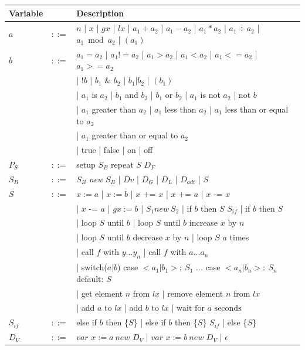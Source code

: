 \begin{table}[H]
\centering
\begin{tabular}{@{}lll@{}}
\toprule
Variable &       & Description                      \\ \midrule
$a$        & $::=$ & $n$ | $x$ | $gx$ | $lx$ | $a_1 + a_2$ | $a_1 - a_2$ | $a_1 * a_2$ | $a_1 \div a_2$ | $a_1 \bmod a_2$ | $ (a_1) $    \\
$b$        & $::=$ & $a_1 = a_2$ | $a_1 != a_2$ | $a_1 > a_2$ | $a_1 < a_2$ | $a_1 <= a_2$ | $a_1 >= a_2$            \\
            & & | $!b$ | $b_1$ \& $b_2$ | $b_1 | b_2$ | $(b_1)$  \\
            &&  | $a_1$ is $a_2$ | $b_1$ and $b_2$  | $b_1$ or $b_2$ |  $a_1$ is not $a_2$ | not $b$ \\
            &&  | $a_1$ greater than $a_2$  |  $a_1$ less than $a_2$  | $a_1$ less than or equal to $a_2$  \\
            &&  | $a_1$ greater than or equal to $a_2$ \\
            & & | true | false | on | off \\
$P_S$      & $::=$ & setup $S_B$ repeat $S$ $D_F$\\
$S_B$    & $::=$ & $S_B$ \textit{new} $S_B$ | $Dv$ | $D_G$ | $D_L$ | $D_{adt}$ | $S$\\ 
$S$        & $::=$ & $x:= a$ | $x:= b$ | $x \text{ += } x$ | $x \text{ += } a$ | $x \text{ -= } x$  \\
           & & | $x \text{ -= } a$ | $gx := b$ | $S_1 \textit{new} \: S_2$ | if $b$ then $S$ $S_{if}$ | if $b$ then $S$ \\
           & & | loop $S$ until $b$ | loop $S$ until $b$ increase $x$ by $n$  \\
           & & | loop $S$ until $b$ decrease $x$ by $n$ | loop $S$ $a$ times \\
           & & |  call $f$ with $y...y_n$ | call $f$ with $a...a_n$  \\
           & & | switch($a|b$) case $<a_1|b_1>: \: S_1$ $...$ case $<a_n|b_n>: \: S_n$ default: $S$ \\
           &&  | get element $n$ from $lx$ | remove element $n$ from $lx$  \\
           &&  | add $a$ to $lx$ | add $b$ to $lx$ | $\text{wait for } a \text{ seconds}$  \\
$S_{if}$     & $::=$ &  else if $b$ then \{$S$\} | else if $b$ then \{$S$\} $S_{if}$ |  else \{$S$\} \\
$D_V$       & $::=$ & $var$ $x := a \: \textit{new}$ $D_V$ | $var$ $x := b \: \textit{new}$ $D_V$ | $\epsilon$ \\

\end{tabular}
\end{table}
